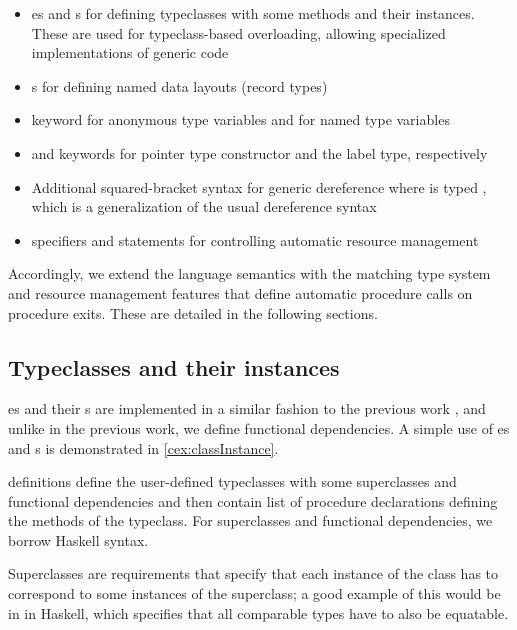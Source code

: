 \begin{itemize}
    \item {}es and s for defining typeclasses with some methods and their instances. These are used for typeclass-based overloading, allowing specialized implementations of generic code

    \item {}s for defining named data layouts (record types)

    \item {} keyword for anonymous type variables and  for named type variables

    \item {} and  keywords for pointer type constructor and the label type, respectively

    \item Additional squared-bracket syntax for generic dereference \li{[address]} where  is typed , which is a generalization of the usual \cmm dereference syntax 

    \item {} specifiers and  statements for controlling automatic resource management
\end{itemize}

Accordingly, we extend the language semantics with the matching type system and resource management features that define automatic procedure calls on procedure exits. These are detailed in the following sections.

\subsection{Typeclasses and their instances}

es and their s are implemented in a similar fashion to the previous work \cite{klepl2020type}, and unlike in the previous work, we define functional dependencies. A simple use of es and s is demonstrated in \cref{cex:classInstance}.

 definitions define the user-defined typeclasses with some superclasses and functional dependencies and then contain list of procedure declarations defining the methods of the typeclass. For superclasses and functional dependencies, we borrow Haskell syntax.

Superclasses are requirements that specify that each instance of the class has to correspond to some instances of the superclass; a good example of this would be  in  in Haskell, which specifies that all comparable types have to also be equatable.

